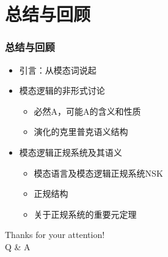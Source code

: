 \documentclass[CJK]{beamer}
\begin{document}

\section*{总结与回顾}

\begin{frame}
 \frametitle{总结与回顾}
 \begin{itemize}
 \item 引言：从模态词说起
 \item 模态逻辑的非形式讨论
   \begin{itemize}
   \item 必然A，可能A的含义和性质
   \item 演化的克里普克语义结构
   \end{itemize}
 \item 模态逻辑正规系统及其语义
   \begin{itemize}
   \item 模态语言及模态逻辑正规系统NSK
   \item 正规结构
   \item 关于正规系统的重要元定理
   \end{itemize}
 \end{itemize}
\end{frame}

\begin{frame}
 \begin{center}
   \huge Thanks for your attention! \\ Q \& A
 \end{center}
\end{frame}

\end{document}
